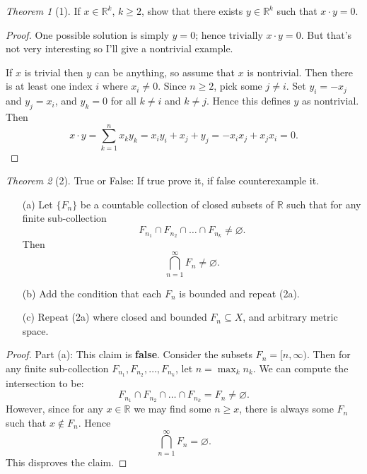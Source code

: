 \documentclass[12pt]{article}
\theoremstyle{remark}
\theoremstyle{named}
\newtheorem*{theorem}{Theorem}
\begin{document}
\begin{theorem}[1]
    If \(x \in \mathbb R^k\), \(k \ge 2\), show that there exists \(y \in \mathbb R^k\) such that \(x \cdot y = 0\).
\end{theorem}

\begin{proof}
    One possible solution is simply \(y = 0\); hence trivially \(x \cdot y = 0\). But that's not very interesting so I'll give a nontrivial example.

    If \(x\) is trivial then \(y\) can be anything, so assume that \(x\) is nontrivial. Then there is at least one index \(i\) where \(x_i \neq 0\). Since \(n \ge 2\), pick some \(j \neq i\). Set \(y_i = -x_j\) and \(y_j = x_i\), and \(y_k = 0\) for all \(k \neq i\) and \(k \neq j\). Hence this defines \(y\) as nontrivial. Then 
    \[x \cdot y = \sum_{k = 1}^n x_k y_k = x_i y_i + x_j + y_j = - x_i x_j + x_j x_i = 0.\]
\end{proof}

\begin{theorem}[2]
    True or False: If true prove it, if false counterexample it.
    \begin{enumerate}
        \item [(a)] Let \(\{F_n\}\) be a countable collection of closed subsets of \(\mathbb R\) such that for any finite sub-collection 
        \[F_{n_1} \cap F_{n_2} \cap \dots \cap F_{n_k} \neq \varnothing.\]
        Then 
        \[\bigcap_{n = 1}^\infty F_n \neq \varnothing.\]
        \item [(b)] Add the condition that each \(F_n\) is bounded and repeat (2a).
        \item [(c)] Repeat (2a) where closed and bounded \(F_n \subseteq X\), and arbitrary metric space.
    \end{enumerate}
\end{theorem}

\begin{proof}
    Part (a): This claim is \textbf{false}. Consider the subsets \(F_n = [n, \infty)\). Then for any finite sub-collection \(F_{n_1}, F_{n_2}, \dots, F_{n_k}\), let \(n = \max_{k} n_k\). We can compute the intersection to be: 
    \[F_{n_1} \cap F_{n_2} \cap \dots \cap F_{n_k} = F_{n} \neq \varnothing.\]
    However, since for any \(x \in \mathbb R\) we may find some \(n \ge x\), there is always some \(F_n\) such that \(x \notin F_n\). Hence 
    \[\bigcap_{n=1}^\infty F_n = \varnothing.\]
    This disproves the claim.
\end{proof}
\end{document}
